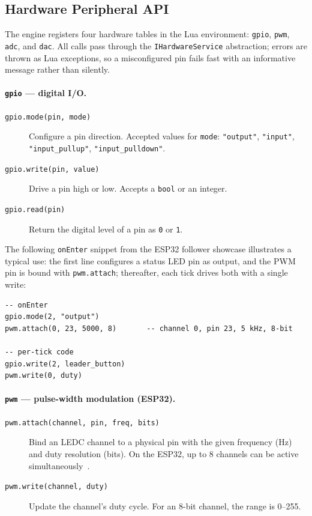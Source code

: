 \subsection{Hardware Peripheral API}

The engine registers four hardware tables in the Lua environment: \texttt{gpio}, \texttt{pwm}, \texttt{adc}, and \texttt{dac}. All calls pass through the \texttt{IHardwareService} abstraction; errors are thrown as Lua exceptions, so a misconfigured pin fails fast with an informative message rather than silently.

\paragraph{\texttt{gpio} --- digital I/O.}
\begin{description}
  \item[\texttt{gpio.mode(pin, mode)}] Configure a pin direction. Accepted values for \texttt{mode}: \texttt{"output"}, \texttt{"input"}, \texttt{"input\_pullup"}, \texttt{"input\_pulldown"}.
  \item[\texttt{gpio.write(pin, value)}] Drive a pin high or low. Accepts a \texttt{bool} or an integer.
  \item[\texttt{gpio.read(pin)}] Return the digital level of a pin as \texttt{0} or \texttt{1}.
\end{description}

The following \texttt{onEnter} snippet from the ESP32 follower showcase illustrates a typical use: the first line configures a status LED pin as output, and the PWM pin is bound with \texttt{pwm.attach}; thereafter, each tick drives both with a single write:

\begin{lstlisting}[language={}]
-- onEnter
gpio.mode(2, "output")
pwm.attach(0, 23, 5000, 8)       -- channel 0, pin 23, 5 kHz, 8-bit

-- per-tick code
gpio.write(2, leader_button)
pwm.write(0, duty)
\end{lstlisting}

\paragraph{\texttt{pwm} --- pulse-width modulation (ESP32).}
\begin{description}
  \item[\texttt{pwm.attach(channel, pin, freq, bits)}] Bind an LEDC channel to a physical pin with the given frequency (Hz) and duty resolution (bits). On the ESP32, up to 8 channels can be active simultaneously~\cite{ESP32TRM}.
  \item[\texttt{pwm.write(channel, duty)}] Update the channel's duty cycle. For an 8-bit channel, the range is 0--255.
\end{description}

